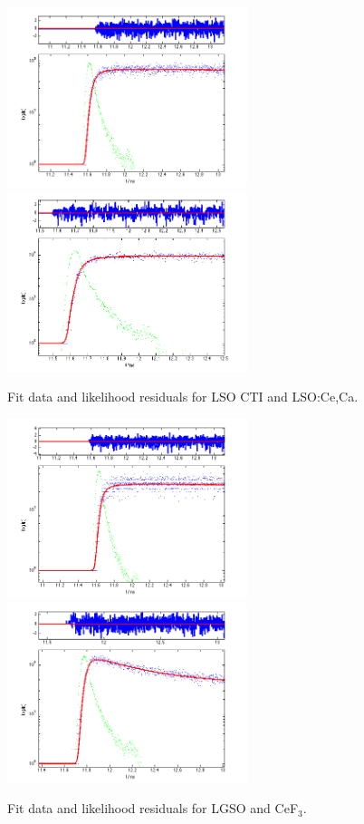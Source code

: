 \begin{figure}[htbp]
\begin{center}
\includegraphics[width=7cm]{../Pictures/Chapter_7/CTI.png}
\includegraphics[width=7cm]{../Pictures/Chapter_7/ca_ce.png}
\end{center}
\caption[LSO CTI and LSO:Ce,Ca profile]{Fit data and likelihood residuals for LSO CTI and LSO:Ce,Ca.} \label{fig:cti_cace}
\end{figure}

\begin{figure}[htbp]
\begin{center}
\includegraphics[width=7cm]{../Pictures/Chapter_7/lgso.png}
\includegraphics[width=7cm]{../Pictures/Chapter_7/cef3.png}
\end{center}
\caption[LGSO and CeF$_{3}$ profile]{Fit data and likelihood residuals for LGSO and CeF$_{3}$.} \label{fig:lgso_cef3}
\end{figure}

